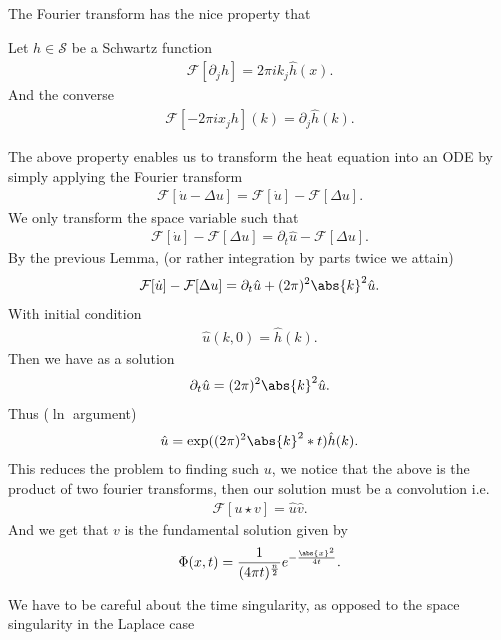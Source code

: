 The Fourier transform has the nice property that 
\begin{Lemma}
 Let $h \in  \mathcal{S}$ be a Schwartz function
 \begin{align*}
   \mathcal{F}[\partial_j h] = 2\pi i k_j \hat{h}(x) 
 .\end{align*}
 And the converse 
 \begin{align*}
   \mathcal{F}[-2\pi ix_j h](k) = \partial_j \hat{h}(k) 
 .\end{align*}
\end{Lemma}
The above property enables us to transform the heat equation into an ODE by simply applying the Fourier transform 
\begin{align*}
  \mathcal{F}[\dot{u} - \Delta u ] =  \mathcal{F}[\dot{u}] - \mathcal{F}[ \Delta u]
.\end{align*}
We only transform the space variable such that 
\begin{align*}
   \mathcal{F}[\dot{u}] - \mathcal{F}[ \Delta u] = \partial_t \hat{u}  -  \mathcal{F}[ \Delta u]
.\end{align*}
By the previous Lemma, (or rather integration by parts twice we attain)
\begin{align*}
  \mathcal{F}[\dot{u}] - \mathcal{F}[ \Delta u] = \partial_t \hat{u}  + (2\pi)^2 \abs{k}^2 \hat{u}   
.\end{align*}
With initial condition 
\begin{align*}
  \hat{u}(k,0) = \hat{h}(k) 
.\end{align*}
Then we have as a solution 
\begin{align*}
  \partial_t \hat{u}  =  (2\pi)^2 \abs{k}^2 \hat{u}
.\end{align*}
Thus ($\ln $ argument)
\begin{align*}
  \hat{u} = \exp((2\pi)^2 \abs{k}^2*t ) \hat{h}(k) 
.\end{align*}
This reduces the problem to finding such $u$, we notice that the above is the product of two fourier transforms, then our solution must be a convolution i.e.
\begin{align*}
  \mathcal{F}[u \star  v] = \hat{u}\hat{v}  
.\end{align*}
And we get that $v$ is the fundamental solution given by
\begin{align*}
\Phi(x,t) = \frac{1}{(4\pi t)^{\frac{n}{2}}}e^{- \frac{\abs{x}^2}{4t}}   
.\end{align*}
\begin{note}
 We have to be careful about the time singularity, as opposed to the space singularity in the Laplace case  
\end{note}
